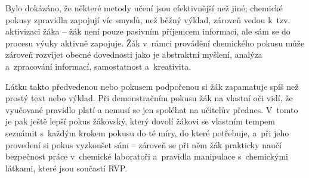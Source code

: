 Bylo dokázáno, že některé metody učení jsou efektivnější než jiné; \cite{badani} chemické pokusy zpravidla zapojují víc smyslů, než běžný výklad, zároveň vedou k~tzv. aktivizaci žáka -- žák není pouze pasivním příjemcem informací, ale sám se do procesu výuky aktivně zapojuje. \cite{aktivizace} Žák v~rámci provádění chemického pokusu může zároveň rozvíjet obecné dovednosti jako je abstraktní myšlení, analýza a~zpracování informací, samostatnost a~kreativita. \cite{ostrava} \cite{aktivizace}

Látku takto předvedenou nebo pokusem podpořenou si žák zapamatuje spíš než prostý text nebo výklad. \cite{badani} Při demonstračním pokusu žák na vlastní oči vidí, že vyučované pravidlo platí a nemusí se jen spoléhat na učitelův přednes. V~tomto je pak ještě lepší pokus žákovský, který dovolí žákovi se vlastním tempem seznámit s~každým krokem pokusu do té míry, do které potřebuje, a~při jeho provedení si pokus vyzkoušet sám -- zároveň se při něm žák prakticky naučí bezpečnost práce v~chemické laboratoři a~pravidla manipulace s~chemickými látkami, které jsou součastí RVP.


